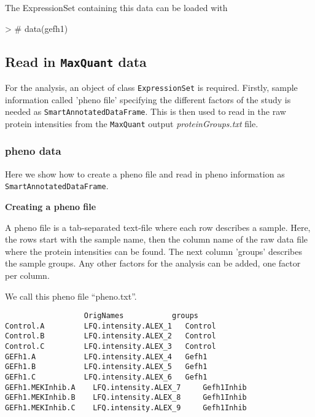 \documentclass[a4paper,11pt]{article}
\newcommand{\Robject}[1]{{\texttt{#1}}}
\begin{document}
The ExpressionSet containing this data can be loaded with
\begin{Schunk}
\begin{Sinput}
> # data(gefh1)
\end{Sinput}
\end{Schunk}

\subsection{Read in \texttt{MaxQuant} data}

For the analysis, an object of class \Robject{ExpressionSet} is required. Firstly, sample information called 'pheno file' specifying the different factors of the study is needed as \Robject{SmartAnnotatedDataFrame}. This is then used to read in the raw protein intensities from the \texttt{MaxQuant} output \emph{proteinGroups.txt} file.

\subsubsection{pheno data}

Here we show how to create a pheno file and read in pheno information
as \Robject{SmartAnnotatedDataFrame}.

\textbf{Creating a pheno file}

A pheno file is a tab-separated text-file where each row describes a sample.
Here, the rows start with the sample name, then the column name of the raw data file
where the protein intensities can be found. The next column 'groups' 
describes the sample groups. Any other 
factors for the analysis can be added, one factor per column.

We call this pheno file ``pheno.txt''.

\begin{verbatim}
                  OrigNames	          groups	    
Control.A	      LFQ.intensity.ALEX_1	 Control	    
Control.B	      LFQ.intensity.ALEX_2	 Control	    
Control.C	      LFQ.intensity.ALEX_3	 Control	    
GEFh1.A           LFQ.intensity.ALEX_4	 Gefh1	    
GEFh1.B           LFQ.intensity.ALEX_5	 Gefh1	    
GEFh1.C           LFQ.intensity.ALEX_6	 Gefh1	    
GEFh1.MEKInhib.A	LFQ.intensity.ALEX_7	 Gefh1Inhib	 
GEFh1.MEKInhib.B	LFQ.intensity.ALEX_8	 Gefh1Inhib	 
GEFh1.MEKInhib.C	LFQ.intensity.ALEX_9	 Gefh1Inhib	 
\end{verbatim}
\end{document}
